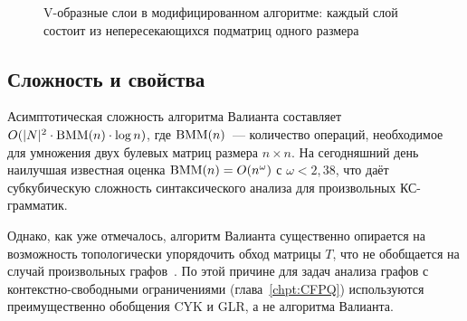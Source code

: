 \begin{figure}[h]
  \centering
  \resizebox{0.7\linewidth}{!}{}
  \caption{V-образные слои в модифицированном алгоритме: каждый слой состоит из непересекающихся подматриц одного размера}
  \label{fig:ValiantLayers}
\end{figure}

\subsection{Сложность и свойства}

Асимптотическая сложность алгоритма Валианта составляет $O(|N|^2 \cdot \operatorname{BMM}(n) \cdot \log n)$, где $\operatorname{BMM}(n)$~--- количество операций, необходимое для умножения двух булевых матриц размера $n \times n$.
На сегодняшний день наилучшая известная оценка $\operatorname{BMM}(n) = O(n^\omega)$ с $\omega < 2{,}38$, что даёт субкубическую сложность синтаксического анализа для произвольных КС-грамматик.

Однако, как уже отмечалось, алгоритм Валианта существенно опирается на возможность топологически упорядочить обход матрицы $T$, что не обобщается на случай произвольных графов~.
По этой причине для задач анализа графов с контекстно-свободными ограничениями (глава~\ref{chpt:CFPQ}) используются преимущественно обобщения CYK и GLR, а не алгоритма Валианта.


